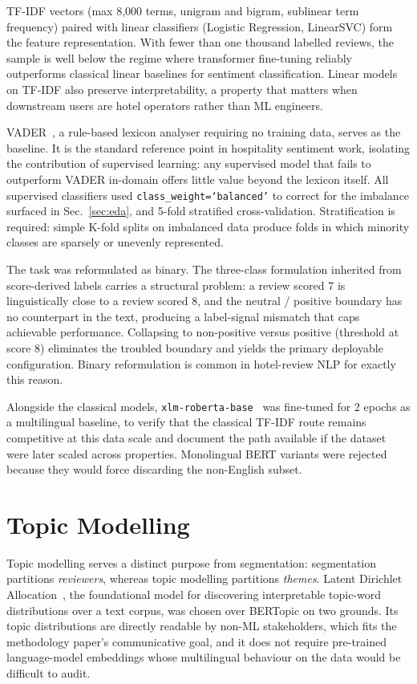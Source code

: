 \documentclass[runningheads]{llncs}
\begin{document}
TF-IDF vectors (max 8{,}000 terms, unigram and bigram, sublinear term
frequency) paired with linear classifiers (Logistic Regression, LinearSVC)
form the feature representation. With fewer than one thousand labelled
reviews, the sample is well below the regime where transformer fine-tuning
reliably outperforms classical linear baselines for sentiment
classification. Linear models on TF-IDF also preserve interpretability,
a property that matters when downstream users are hotel operators rather
than ML engineers.

VADER~\cite{vader2014}, a rule-based lexicon analyser requiring no
training data, serves as the baseline. It is the standard reference point
in hospitality sentiment work, isolating the contribution of supervised
learning: any supervised model that fails to outperform VADER in-domain
offers little value beyond the lexicon itself. All supervised classifiers
used \texttt{class\_weight=`balanced'} to correct for the imbalance
surfaced in Sec.~\ref{sec:eda}, and 5-fold stratified cross-validation.
Stratification is required: simple K-fold splits on imbalanced data
produce folds in which minority classes are sparsely or unevenly
represented.

The task was reformulated as binary. The three-class formulation
inherited from score-derived labels carries a structural problem: a
review scored 7 is linguistically close to a review scored 8, and the
neutral / positive boundary has no counterpart in the text, producing a
label-signal mismatch that caps achievable performance. Collapsing to
non-positive versus positive (threshold at score 8) eliminates the
troubled boundary and yields the primary deployable configuration.
Binary reformulation is common in hotel-review NLP for exactly this
reason.

Alongside the classical models, \texttt{xlm-roberta-base}~\cite{xlmroberta2020}
was fine-tuned for 2 epochs as a multilingual baseline, to verify that
the classical TF-IDF route remains competitive at this data scale and
document the path available if the dataset were later scaled across
properties. Monolingual BERT variants were rejected because they would
force discarding the non-English subset.

\section{Topic Modelling}

Topic modelling serves a distinct purpose from segmentation: segmentation
partitions \textit{reviewers}, whereas topic modelling partitions
\textit{themes}. Latent Dirichlet Allocation~\cite{blei2003}, the
foundational model for discovering interpretable topic-word distributions
over a text corpus, was chosen over BERTopic on two grounds. Its topic
distributions are directly readable by non-ML stakeholders, which fits
the methodology paper's communicative goal, and it does not require
pre-trained language-model embeddings whose multilingual behaviour on
the data would be difficult to audit.
\end{document}

